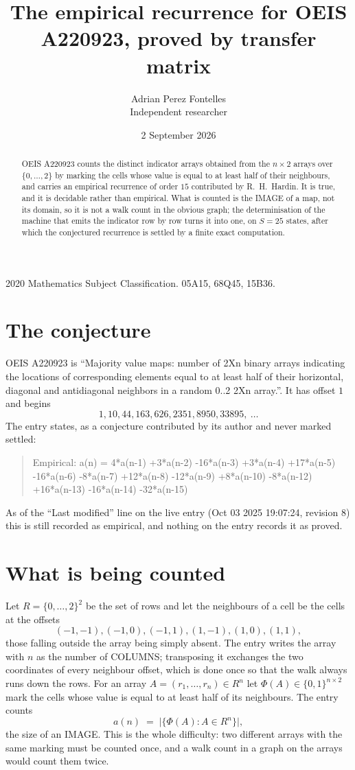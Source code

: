 \documentclass[11pt,a4paper]{article}
\title{The empirical recurrence for OEIS A220923, proved by transfer matrix}
\author{Adrian Perez Fontelles\\ \small Independent researcher}
\date{2 September 2026}
\theoremstyle{plain}
\theoremstyle{definition}
\begin{document}
\maketitle

\begin{abstract}
OEIS A220923 counts the distinct indicator arrays obtained from the $n\times2$ arrays over
$\{0,\dots,2\}$ by marking the cells whose value is equal to at least half of their neighbours, and carries an
empirical recurrence of order $15$ contributed by R.~H.~Hardin. It is true, and it is
decidable rather than empirical. What is counted is the IMAGE of a map, not its domain, so it
is not a walk count in the obvious graph; the determinisation of the machine that emits the
indicator row by row turns it into one, on $S=25$ states, after which the conjectured
recurrence is settled by a finite exact computation.
\end{abstract}

\noindent\small 2020 Mathematics Subject Classification. 05A15, 68Q45, 15B36.\normalsize

\section{The conjecture}

OEIS A220923 is ``Majority value maps: number of 2Xn binary arrays indicating the locations of corresponding elements equal to at least half of their horizontal, diagonal and antidiagonal neighbors in a random 0..2 2Xn array.''. It has offset $1$ and begins
\[
1, 10, 44, 163, 626, 2351, 8950, 33895,\ \dots
\]
The entry states, as a conjecture contributed by its author and never marked settled:
\begin{quote}
Empirical: a(n) = 4*a(n-1) +3*a(n-2) -16*a(n-3) +3*a(n-4) +17*a(n-5) -16*a(n-6) -8*a(n-7) +12*a(n-8) -12*a(n-9) +8*a(n-10) -8*a(n-12) +16*a(n-13) -16*a(n-14) -32*a(n-15)
\end{quote}
As of the ``Last modified'' line on the live entry (Oct 03 2025 19:07:24, revision 8) this is still
recorded as empirical, and nothing on the entry records it as proved.

\section{What is being counted}

Let $R=\{0,\dots,2\}^{2}$ be the set of rows and let the neighbours of a cell be the
cells at the offsets
\[
(-1,-1), (-1,0), (-1,1), (1,-1), (1,0), (1,1),
\]
those falling outside the array being simply absent. The entry writes the array with $n$ as the number of COLUMNS; transposing it exchanges the two coordinates of every neighbour offset, which is done once so that the walk always runs down the rows. For an array
$A=(r_1,\dots,r_n)\in R^n$ let $\Phi(A)\in\{0,1\}^{n\times2}$ mark the cells whose value
is equal to at least half of its neighbours. The entry counts
\[
a(n)\;=\;\bigl|\{\Phi(A):A\in R^n\}\bigr| ,
\]
the size of an IMAGE. This is the whole difficulty: two different arrays with the same marking
must be counted once, and a walk count in a graph on the arrays would count them twice.
\end{document}
